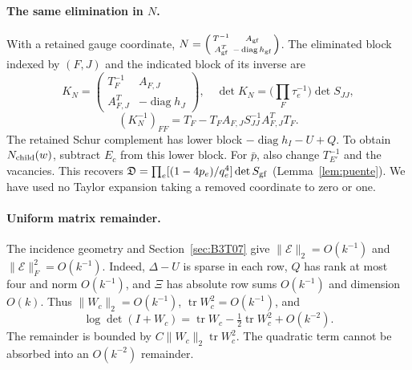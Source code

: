 \paragraph{The same elimination in $N$.}
With a retained gauge coordinate, $N=\left(\begin{smallmatrix}T^{-1}&A_{\rm gf}\\
A_{\rm gf}^T&-\operatorname{diag}h_{\rm gf}\end{smallmatrix}\right)$.
The eliminated block indexed by $(F,J)$ and the indicated block of its inverse are
\[
 K_N=\begin{pmatrix}T_F^{-1}&A_{F,J}\\A_{F,J}^T&-\operatorname{diag}h_J\end{pmatrix},
 \quad \det K_N=\Big(\prod_F\tau_e^{-1}\Big)\det S_{JJ},
\]
\[
 (K_N^{-1})_{FF}=T_F-T_FA_{F,J}S_{JJ}^{-1}A_{F,J}^TT_F.
\]
The retained Schur complement has lower block $-\operatorname{diag}h_I-U+Q$.
To obtain $N_{\rm child}(w)$, subtract $E_c$ from this lower block. For $\bar p$, also change $T_{E'}^{-1}$
and the vacancies.
This recovers $\mathfrak D=\prod_e[(1-4p_e)/q_e^4]\det S_{\rm gf}$ (Lemma~\ref{lem:puente}). We have used no
Taylor expansion taking a removed coordinate to zero or one.

\paragraph{Uniform matrix remainder.}
The incidence geometry and Section~\ref{sec:B3T07} give $\|\mathcal E\|_2=O(k^{-1})$ and $\|\mathcal
E\|_F^2=O(k^{-1})$. Indeed, $\Delta-U$ is sparse in each row, $Q$ has rank at most four and norm
$O(k^{-1})$, and $\Xi$ has absolute row sums $O(k^{-1})$ and dimension $O(k)$.
Thus $\|W_c\|_2=O(k^{-1})$, $\operatorname{tr}W_c^2=O(k^{-1})$, and
\[
 \boxed{\log\det(I+W_c)=\operatorname{tr}W_c
       -\tfrac12\operatorname{tr}W_c^2+O(k^{-2}).}
\]
The remainder is bounded by $C\|W_c\|_2\operatorname{tr}W_c^2$. The quadratic term cannot be absorbed into
an $O(k^{-2})$ remainder.
